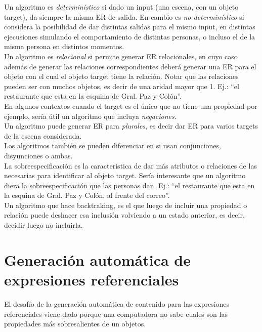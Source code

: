 Un algoritmo es {\it determin\'{i}stico} si dado un input (una escena, con un objeto target), da siempre la misma ER de salida. En cambio es {\it no-determin\'{i}stico} si considera la posibilidad de dar distintas salidas para el mismo input, en distintas ejecusiones simulando el comportamiento de distintas personas, o incluso el de la misma persona en distintos momentos.\\

Un algoritmo es {\it relacional} si permite generar ER relacionales, en cuyo caso adem\'as de generar las relaciones correspondientes deber\'a generar una ER para el objeto con el cual el objeto target tiene la relaci\'on. Notar que las relaciones pueden ser con muchos objetos, es decir de una aridad mayor que 1. Ej.: ``el restaurante que esta en la esquina de Gral. Paz y Col\'on''.\\

En algunos contextos cuando el target es el \'unico que no tiene una propiedad por ejemplo, ser\'ia \'util un algoritmo que incluya {\it negaciones}.\\

Un algoritmo puede generar ER para {\it plurales}, es decir dar ER para varios targets de la escena considerada.\\

Los algoritmos tambi\'en se pueden diferenciar en si usan conjunciones, disyunciones o ambas.\\

La sobreespecificaci\'on es la caracter\'istica de dar m\'as atributos o relaciones de las necesarias para identificar al objeto target. Ser\'ia interesante que un algoritmo diera la sobreespecificaci\'on que las personas dan. Ej.: ``el restaurante que esta en la esquina de Gral. Paz y Col\'on, al frente del correo''.\\

Un algoritmo que hace backtraking, es el que luego de incluir una propiedad o relaci\'on puede deshacer esa inclusi\'on volviendo a un estado anterior, es decir, decidir luego no incluirla.\\

\section{Generaci\'on autom\'atica de expresiones referenciales}

El desaf\'io de la generaci\'on autom\'atica de contenido para las expresiones referenciales viene dado porque una computadora no sabe cuales son las propiedades m\'as sobresalientes de un objetos.

